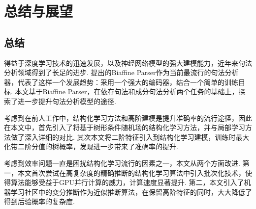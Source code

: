 \chapter{总结与展望}

\section{总结}
得益于深度学习技术的迅速发展，以及神经网络模型的强大建模能力，近年来句法分析领域得到了长足的进步.
\citet{dozat-etal-2017-biaffine}提出的Biaffine Parser作为当前最流行的句法分析器，代表了这样一个发展趋势：采用一个强大的编码器，结合一个简单的训练目标.
本文基于Biaffine Parser，在依存句法和成分句法分析两个任务的基础上，探索了进一步提升句法分析模型的途径.

考虑到在前人工作中，结构化学习方法和高阶建模是提升准确率的流行途径，因此在本文中，首先引入了将基于树形条件随机场的结构化学习方法，并与局部学习方法做了深入详细的对比.
其次本文将二阶特征引入到结构化学习建模，训练时最大化带二阶分值的树概率，发现进一步带来了准确率的提升.

考虑到效率问题一直是困扰结构化学习流行的因素之一，本文从两个方面改进.
第一，本文首次尝试在高复杂度的精确推断的结构化学习算法中引入批次化技术，使得算法能够受益于GPU并行计算的威力，计算速度显著提升.
第二，本文引入了机器学习社区中的变分推断作为近似推断算法，在保留高阶特征的同时，大大降低了得到后验概率的复杂度.

